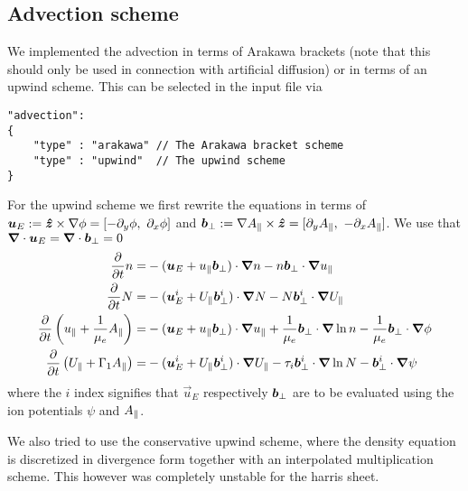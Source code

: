 \subsection{Advection scheme}
We implemented the advection in terms of Arakawa brackets
(note that this should only be used in connection with artificial diffusion)
or in terms of an upwind scheme.
This can be selected in the input file via
\begin{verbatim}
"advection":
{
    "type" : "arakawa" // The Arakawa bracket scheme
    "type" : "upwind"  // The upwind scheme
}
\end{verbatim}
For the upwind scheme we first rewrite the equations in terms of
${\boldsymbol{u}}_E := \bm{\hat{z}} \times \nabla\phi = [-\partial_y \phi,\ \partial_x \phi]$ and
$ {\boldsymbol{b}}_\perp := \nabla A_\parallel \times \bm{\hat{z}} = [\partial_y A_\parallel,\ -\partial_x A_\parallel]$. We use
that ${\boldsymbol{\nabla}}\cdot {\boldsymbol{u}}_E = {\boldsymbol{\nabla}}\cdot  {\boldsymbol{b}}_\perp =0$
\begin{align}
\frac{\partial}{\partial t} n  =&
- ( {\boldsymbol{u}}_E + u_\parallel  {\boldsymbol{b}}_\perp)\cdot{\boldsymbol{\nabla}} n  - n   {\boldsymbol{b}}_\perp \cdot{\boldsymbol{\nabla}}  u_\parallel
\\
\frac{\partial}{\partial t} N =&
- ( {\boldsymbol{u}}_E^i + U_\parallel  {\boldsymbol{b}}_\perp^i)\cdot{\boldsymbol{\nabla}} N - N  {\boldsymbol{b}}_\perp^i\cdot{\boldsymbol{\nabla}}  U_\parallel
 \\
\frac{\partial}{\partial t} \left( u_\parallel+ \frac{1}{\mu_e} A_\parallel \right) =&
-  ({\boldsymbol{u}}_E + u_\parallel  {\boldsymbol{b}}_\perp ) \cdot{\boldsymbol{\nabla}} u_\parallel
+ \frac{1}{\mu_e}  {\boldsymbol{b}}_\perp \cdot{\boldsymbol{\nabla}} \ln n 
- \frac{1}{\mu_e}  {\boldsymbol{b}}_\perp \cdot{\boldsymbol{\nabla}} \phi
      \\
      \frac{\partial}{\partial t} \left( U_\parallel+ \Gamma_1 A_\parallel  \right) =&
    - ({\boldsymbol{u}}_E^i + U_\parallel  {\boldsymbol{b}}_\perp^i ) \cdot{\boldsymbol{\nabla}} U_\parallel
    - \tau_i  {\boldsymbol{b}}_\perp^i \cdot{\boldsymbol{\nabla}} \ln N
    -  {\boldsymbol{b}}_\perp^i \cdot{\boldsymbol{\nabla}} \psi
\end{align}
where the $i$ index signifies that $\vec u_E$ respectively $ {\boldsymbol{b}}_\perp$ are to
be evaluated using the ion potentials $\psi$ and $A_\parallel$.
\begin{tcolorbox}[title=Note]
    We also tried to use the conservative upwind scheme, where the density equation
    is discretized in divergence form together with an interpolated multiplication
    scheme. This however was completely unstable for the harris sheet.
\end{tcolorbox}
